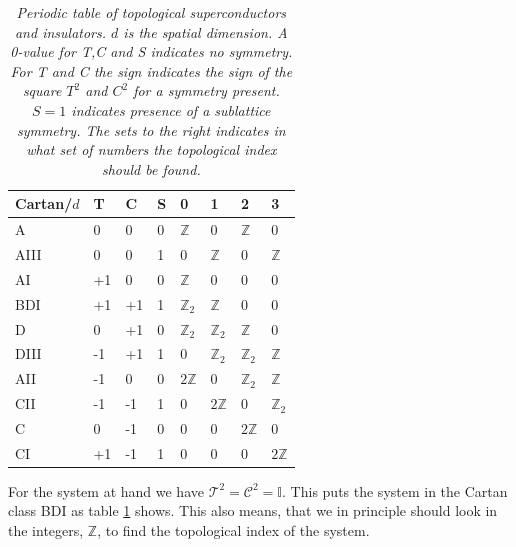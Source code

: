 \begin{table}[htb]
\centering
\caption{\textit{Periodic table of topological superconductors and insulators. $d$ is the spatial dimension. A 0-value for T,C and S indicates no symmetry. For T and C the sign indicates the sign of the square $T^2$ and $C^2$ for a symmetry present. $S=1$ indicates presence of a sublattice symmetry. The sets to the right indicates in what set of numbers the topological index should be found. }}
\begin{tabular}{|l|l l l|l l l l|}
\hline Cartan/$d$   &  T &  C & S					& 0 & 1 & 2 & 3 \\
\hline A    		&  0 &  0 & 0					& $\mathbb{Z}$ & 0 & $\mathbb{Z}$ & 0   			 \\
\hline AIII 		&  0 &  0 & 1					& 0 & $\mathbb{Z}$ & 0 & $\mathbb{Z}$   			 \\
\hline AI   		& +1 &  0 & 0					& $\mathbb{Z}$ & 0 & 0 & 0 			    			 \\
\hline BDI	       	& +1 & +1 & 1 					& $\mathbb{Z}_2$ & $\mathbb{Z}$ & 0 & 0 			 \\
\hline D	       	&  0 & +1 & 0 					& $\mathbb{Z}_2$ & $\mathbb{Z}_2$ & $\mathbb{Z}$ & 0 \\
\hline DIII	       	& -1 & +1 & 1 					& 0 & $\mathbb{Z}_2$ & $\mathbb{Z}_2$ & $\mathbb{Z}$ \\
\hline AII	       	& -1 &  0 & 0 				 	& $2\mathbb{Z}$ & 0 & $\mathbb{Z}_2$ & $\mathbb{Z}$  \\
\hline CII	       	& -1 & -1 & 1 					& 0 & $2\mathbb{Z}$ & 0 & $\mathbb{Z}_2$  			 \\
\hline C	       	&  0 & -1 & 0 					& 0 & 0 & $2\mathbb{Z}$ & 0  						 \\
\hline CI	       	& +1 & -1 & 1 					& 0 & 0 & 0 & $2\mathbb{Z}$  						 \\
\hline 
\end{tabular}
\label{tab.PeriodicTableTISC}
\end{table}

For the system at hand we have $\mathcal{T}^2 = \mathcal{C}^2 = \mathbb{I}$. This puts the system in the Cartan class BDI as table \ref{tab.PeriodicTableTISC} shows. This also means, that we in principle should look in the integers, $\mathbb{Z}$, to find the topological index of the system. 

